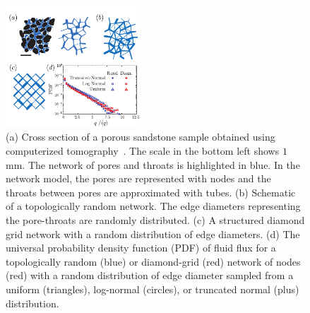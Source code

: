 \documentclass[%
reprint,
 amsmath,amssymb,
 aps,
prl,
]{revtex4-1}
\begin{document}
\begin{figure}[h]
    \includegraphics[width = 0.45\textwidth]{Fig1.pdf}
    \caption{(a) Cross section of a porous sandstone sample obtained using  computerized tomography~\cite{akanji2010finite}. The scale in the bottom left shows $1$mm. The network of pores and throats is highlighted in blue. In the network model, the pores are represented with nodes and the throats between pores are approximated with tubes. (b) Schematic of a topologically random network. The edge diameters representing the pore-throats are randomly distributed. (c) A structured diamond grid network with a random distribution of edge diameters. (d) The universal probability density function (PDF) of fluid flux for a topologically random (blue) or diamond-grid (red) network of nodes (red) with a random distribution of edge diameter sampled from a uniform (triangles), log-normal (circles), or truncated normal (plus) distribution. }    
    \label{fig:fig1}
\end{figure}
\end{document}
